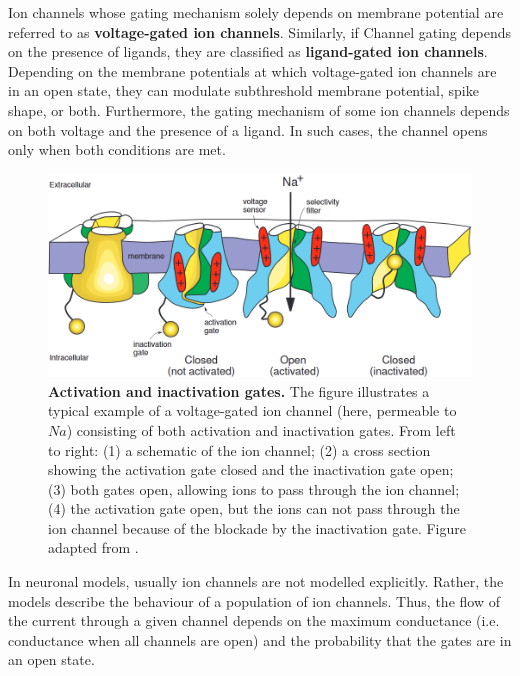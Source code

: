 \documentclass[../main.tex]{subfiles}
\begin{document}
Ion channels whose gating mechanism solely depends on membrane potential are referred to as \textbf{voltage-gated ion channels}. Similarly, if Channel gating depends on the presence of ligands, they are classified as \textbf{ligand-gated ion channels}. Depending on the membrane potentials at which voltage-gated ion channels are in an open state, they can modulate subthreshold membrane potential, spike shape, or both. Furthermore, the gating mechanism of some ion channels depends on both voltage and the presence of a ligand. In such cases, the channel opens only when both conditions are met.

\begin{figure}[!t]
    \centering
    \includegraphics[width=0.85\linewidth]{../img/sleep_and_r5_network/structure_of_v_gated_channels.png}
    \caption[Activation and inactivation gates]{
        \textbf{Activation and inactivation gates.}
        The figure illustrates a typical example of a voltage-gated ion channel (here, permeable to $Na$) consisting of both activation and inactivation gates. From left to right: (1) a schematic of the ion channel; (2) a cross section showing the activation gate closed and the inactivation gate open; (3) both gates open, allowing ions to pass through the ion channel; (4) the activation gate open, but the ions can not pass through the ion channel because of the blockade by the inactivation gate.
        Figure adapted from \parencite{izhikevichDynamicalSystemsNeuroscience2006}.
    }
    \label{fig:voltage_gated_channel_structure}
\end{figure}

In neuronal models, usually ion channels are not modelled explicitly. Rather, the models describe the behaviour of a population of ion channels. Thus, the flow of the current through a given channel depends on the maximum conductance (i.e. conductance when all channels are open) and the probability that the gates are in an open state.%
\end{document}
